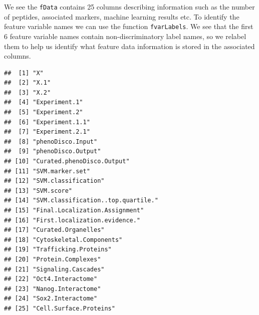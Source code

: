 We see the \texttt{fData} contains 25 columns describing information such as
the number of peptides, associated markers, machine learning results
etc. To identify the feature variable names we can use the function
\texttt{fvarLabels}. We see that the first 6 feature variable names contain
non-discriminatory label names, so we relabel them to help us identify
what feature data information is stored in the associated columns.

\begin{knitrout}
\color{fgcolor}\begin{kframe}
\begin{alltt}
\end{alltt}
\begin{verbatim}
##  [1] "X"                                
##  [2] "X.1"                              
##  [3] "X.2"                              
##  [4] "Experiment.1"                     
##  [5] "Experiment.2"                     
##  [6] "Experiment.1.1"                   
##  [7] "Experiment.2.1"                   
##  [8] "phenoDisco.Input"                 
##  [9] "phenoDisco.Output"                
## [10] "Curated.phenoDisco.Output"        
## [11] "SVM.marker.set"                   
## [12] "SVM.classification"               
## [13] "SVM.score"                        
## [14] "SVM.classification..top.quartile."
## [15] "Final.Localization.Assignment"    
## [16] "First.localization.evidence."     
## [17] "Curated.Organelles"               
## [18] "Cytoskeletal.Components"          
## [19] "Trafficking.Proteins"             
## [20] "Protein.Complexes"                
## [21] "Signaling.Cascades"               
## [22] "Oct4.Interactome"                 
## [23] "Nanog.Interactome"                
## [24] "Sox2.Interactome"                 
## [25] "Cell.Surface.Proteins"
\end{verbatim}
\begin{alltt}
\hlstd{(hl)[}\hlopt{:}\hlstd{]} \hlkwb{<-} \hlstd{(}\hlstd{,} \hlstd{,} \hlstd{)}
\hlstd{(hl)[}\hlopt{:}\hlstd{]} \hlkwb{<-} \hlstd{(}\hlstd{,} \hlopt{:}\hlstd{)}
\hlstd{(hl)[}\hlopt{:}\hlstd{,} \hlopt{:}\hlstd{]}
\end{alltt}
\begin{verbatim}

\end{verbatim}
\end{kframe}
\end{knitrout}
